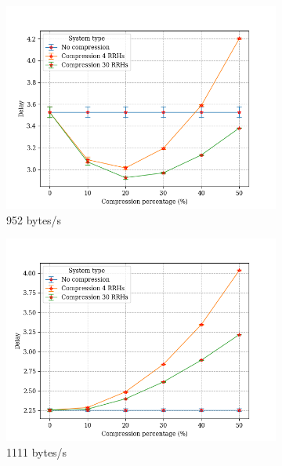 \documentclass[11pt,a4paper,oneside, openright]{article}
\begin{document}
\begin{figure}[H]
	\centering
	\begin{subfigure}{.45\textwidth}
		\centering
		\includegraphics[width=\linewidth]{images/comp-s-952}
		\caption{952 bytes/s}
		\label{fig:comp-s-952}
	\end{subfigure}%
	\begin{subfigure}{.45\textwidth}
		\centering
		\includegraphics[width=\linewidth]{images/comp-s-1111}
		\caption{1111 bytes/s}
		\label{fig:comp-s-1111}
	\end{subfigure}
	\begin{subfigure}{.45\textwidth}
		\centering

\end{subfigure}
\end{figure}
\end{document}
